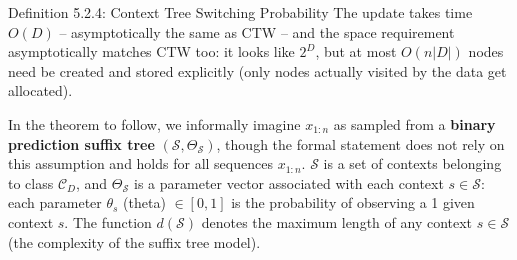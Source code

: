 \documentclass[aspectratio=169,10pt]{beamer}
\begin{document}
\begin{frame}[allowframebreaks]{Definition 5.2.4: Context Tree Switching Probability}
  \medskip
  The update takes time $O(D)$ -- asymptotically the same as CTW -- and the
  space requirement asymptotically matches CTW too: it looks like $2^D$, but
  at most $O(n|D|)$ nodes need be created and stored explicitly (only nodes
  actually visited by the data get allocated).

  \medskip
  In the theorem to follow, we informally imagine $x_{1:n}$ as sampled from
  a \textbf{binary prediction suffix tree} $(\mathcal{S},\Theta_{\mathcal{S}})$,
  though the formal statement does not rely on this assumption and holds for
  all sequences $x_{1:n}$. $\mathcal{S}$ is a set of contexts belonging to
  class $\mathcal{C}_D$, and $\Theta_{\mathcal{S}}$ is a parameter vector
  associated with each context $s\in\mathcal{S}$: each parameter
  $\theta_s$ (theta) $\in[0,1]$ is the probability of observing a 1 given
  context $s$. The function $d(\mathcal{S})$ denotes the maximum length of
  any context $s\in\mathcal{S}$ (the complexity of the suffix tree model).
\end{frame}
\end{document}
